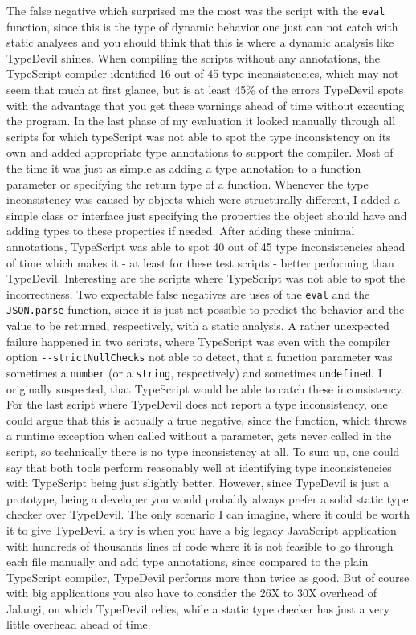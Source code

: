 \documentclass[runningheads,a4paper]{llncs}
\begin{document}
\newpage
The false negative which surprised me the most was the script with the \lstinline[columns=fixed]{eval} function, since this is the type of dynamic behavior one just can not catch with static analyses and you should think that this is where a dynamic analysis like TypeDevil shines.
When compiling the scripts without any annotations, the TypeScript compiler identified 16 out of 45 type inconsistencies, which may not seem that much at first glance, but is at least 45\% of the errors TypeDevil spots with the advantage that you get these warnings ahead of time without executing the program.
In the last phase of my evaluation it looked manually through all scripts for which typeScript was not able to spot the type inconsistency on its own and added appropriate type annotations to support the compiler.
Most of the time it was just as simple as adding a type annotation to a function parameter or specifying the return type of a function.
Whenever the type inconsistency was caused by objects which were structurally different, I added a simple class or interface just specifying the properties the object should have and adding types to these properties if needed.
After adding these minimal annotations, TypeScript was able to spot 40 out of 45 type inconsistencies ahead of time which makes it - at least for these test scripts - better performing than TypeDevil.
Interesting are the scripts where TypeScript was not able to spot the incorrectness.
Two expectable false negatives are uses of the \lstinline[columns=fixed]{eval} and the \lstinline[columns=fixed]{JSON.parse} function, since it is just not possible to predict the behavior and the value to be returned, respectively, with a static analysis.
A rather unexpected failure happened in two scripts, where TypeScript was even with the compiler option \lstinline[columns=fixed]{--strictNullChecks} not able to detect, that a function parameter was sometimes a \lstinline[columns=fixed]{number} (or a \lstinline[columns=fixed]{string}, respectively) and sometimes \lstinline[columns=fixed]{undefined}.
I originally suspected, that TypeScript would be able to catch these inconsistency.
For the last script where TypeDevil does not report a type inconsistency, one could argue that this is actually a true negative, since the function, which throws a runtime exception when called without a parameter, gets never called in the script, so technically there is no type inconsistency at all.
To sum up, one could say that both tools perform reasonably well at identifying type inconsistencies with TypeScript being just slightly better.
However, since TypeDevil is just a prototype, being a developer you would probably always prefer a solid static type checker over TypeDevil.
The only scenario I can imagine, where it could be worth it to give TypeDevil a try is when you have a big legacy JavaScript application with hundreds of thousands lines of code where it is not feasible to go through each file manually and add type annotations, since compared to the plain TypeScript compiler, TypeDevil performs more than twice as good.
But of course with big applications you also have to consider the 26X to 30X overhead of Jalangi, on which TypeDevil relies, while a static type checker has just a very little overhead ahead of time.
\end{document}
